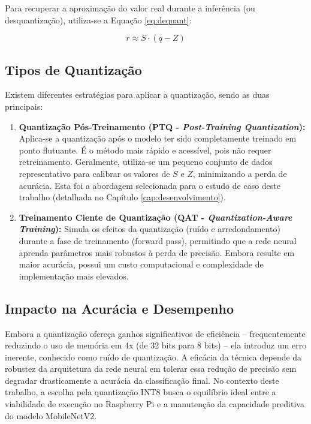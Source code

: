 \documentclass[repeatfields,xlists,xpacks,oneside]{ufrgscca}
\begin{document}
Para recuperar a aproximação do valor real durante a inferência (ou desquantização), utiliza-se a Equação \ref{eq:dequant}:

\begin{equation}
r \approx S \cdot (q - Z)
\label{eq:dequant}
\end{equation}

\subsection{Tipos de Quantização}
Existem diferentes estratégias para aplicar a quantização, sendo as duas principais:

\begin{enumerate}
    \item \textbf{Quantização Pós-Treinamento (PTQ - \textit{Post-Training Quantization}):} Aplica-se a quantização após o modelo ter sido completamente treinado em ponto flutuante. É o método mais rápido e acessível, pois não requer retreinamento. Geralmente, utiliza-se um pequeno conjunto de dados representativo para calibrar os valores de $S$ e $Z$, minimizando a perda de acurácia. Esta foi a abordagem selecionada para o estudo de caso deste trabalho (detalhada no Capítulo \ref{cap:desenvolvimento}).
    
    \item \textbf{Treinamento Ciente de Quantização (QAT - \textit{Quantization-Aware Training}):} Simula os efeitos da quantização (ruído e arredondamento) durante a fase de treinamento (forward pass), permitindo que a rede neural aprenda parâmetros mais robustos à perda de precisão. Embora resulte em maior acurácia, possui um custo computacional e complexidade de implementação mais elevados.
\end{enumerate}

\subsection{Impacto na Acurácia e Desempenho}
Embora a quantização ofereça ganhos significativos de eficiência -- frequentemente reduzindo o uso de memória em 4x (de 32 bits para 8 bits) -- ela introduz um erro inerente, conhecido como ruído de quantização. A eficácia da técnica depende da robustez da arquitetura da rede neural em tolerar essa redução de precisão sem degradar drasticamente a acurácia da classificação final. No contexto deste trabalho, a escolha pela quantização INT8 busca o equilíbrio ideal entre a viabilidade de execução no Raspberry Pi e a manutenção da capacidade preditiva do modelo MobileNetV2.
\end{document}
